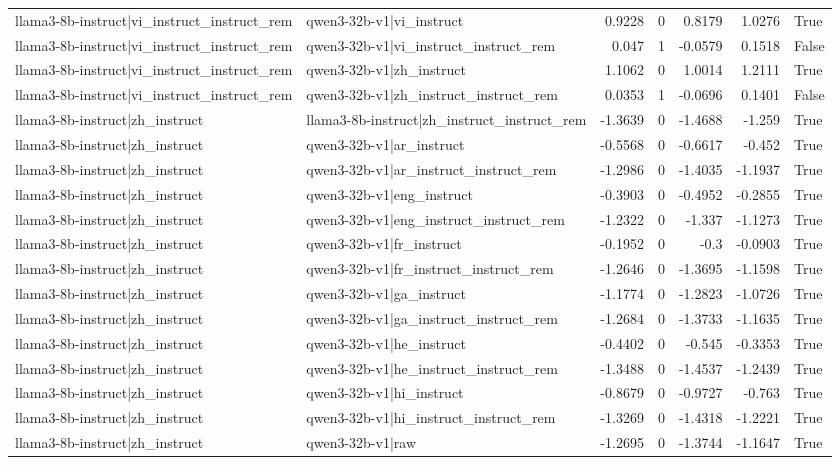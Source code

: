 \begin{table}
\begin{tabular}{l l r r r r l}
llama3-8b-instruct|vi_instruct_instruct_rem & qwen3-32b-v1|vi_instruct & 0.9228 & 0 & 0.8179 & 1.0276 & True \\
llama3-8b-instruct|vi_instruct_instruct_rem & qwen3-32b-v1|vi_instruct_instruct_rem & 0.047 & 1 & -0.0579 & 0.1518 & False \\
llama3-8b-instruct|vi_instruct_instruct_rem & qwen3-32b-v1|zh_instruct & 1.1062 & 0 & 1.0014 & 1.2111 & True \\
llama3-8b-instruct|vi_instruct_instruct_rem & qwen3-32b-v1|zh_instruct_instruct_rem & 0.0353 & 1 & -0.0696 & 0.1401 & False \\
llama3-8b-instruct|zh_instruct & llama3-8b-instruct|zh_instruct_instruct_rem & -1.3639 & 0 & -1.4688 & -1.259 & True \\
llama3-8b-instruct|zh_instruct & qwen3-32b-v1|ar_instruct & -0.5568 & 0 & -0.6617 & -0.452 & True \\
llama3-8b-instruct|zh_instruct & qwen3-32b-v1|ar_instruct_instruct_rem & -1.2986 & 0 & -1.4035 & -1.1937 & True \\
llama3-8b-instruct|zh_instruct & qwen3-32b-v1|eng_instruct & -0.3903 & 0 & -0.4952 & -0.2855 & True \\
llama3-8b-instruct|zh_instruct & qwen3-32b-v1|eng_instruct_instruct_rem & -1.2322 & 0 & -1.337 & -1.1273 & True \\
llama3-8b-instruct|zh_instruct & qwen3-32b-v1|fr_instruct & -0.1952 & 0 & -0.3 & -0.0903 & True \\
llama3-8b-instruct|zh_instruct & qwen3-32b-v1|fr_instruct_instruct_rem & -1.2646 & 0 & -1.3695 & -1.1598 & True \\
llama3-8b-instruct|zh_instruct & qwen3-32b-v1|ga_instruct & -1.1774 & 0 & -1.2823 & -1.0726 & True \\
llama3-8b-instruct|zh_instruct & qwen3-32b-v1|ga_instruct_instruct_rem & -1.2684 & 0 & -1.3733 & -1.1635 & True \\
llama3-8b-instruct|zh_instruct & qwen3-32b-v1|he_instruct & -0.4402 & 0 & -0.545 & -0.3353 & True \\
llama3-8b-instruct|zh_instruct & qwen3-32b-v1|he_instruct_instruct_rem & -1.3488 & 0 & -1.4537 & -1.2439 & True \\
llama3-8b-instruct|zh_instruct & qwen3-32b-v1|hi_instruct & -0.8679 & 0 & -0.9727 & -0.763 & True \\
llama3-8b-instruct|zh_instruct & qwen3-32b-v1|hi_instruct_instruct_rem & -1.3269 & 0 & -1.4318 & -1.2221 & True \\
llama3-8b-instruct|zh_instruct & qwen3-32b-v1|raw & -1.2695 & 0 & -1.3744 & -1.1647 & True \\

\end{tabular}
\end{table}
